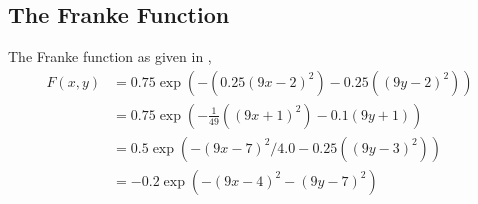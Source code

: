 \documentclass[11pt]{article}
\begin{document}
\subsection{The Franke Function}
The Franke function as given in \cite{franke1979critical},
\begin{align}
    F(x,y) &= 0.75\exp\left(-\left(0.25\left(9x-2\right)^2\right) - 0.25\left(\left(9y-2\right)^2\right)\right) \\
    &= 0.75\exp\left(-\frac{1}{49}\left(\left(9x+1\right)^2\right) - 0.1\left(9y+1\right)\right) \\
    &= 0.5\exp\left(-\left(9x-7\right)^2/4.0 - 0.25\left(\left(9y-3\right)^2\right)\right) \\
    &= -0.2\exp\left(-\left(9x-4\right)^2 - \left(9y-7\right)^2\right)
    \label{eq:franke_function}
\end{align}



\end{document}
